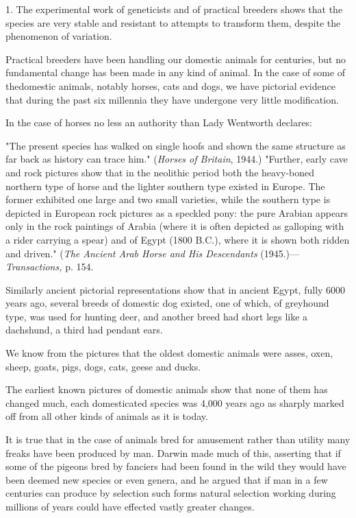 1. The experimental work of geneticists and of practical breeders shows that the species are
very stable and resistant to attempts to transform them, despite the phenomenon of variation.

Practical breeders have been handling our domestic animals for centuries, but no
fundamental change has been made in any kind of animal. In the case of some of thedomestic animals,
notably horses, cats and dogs, we have pictorial evidence that during the
past six millennia they have undergone very little modification.

In the case of horses no less an authority than Lady Wentworth declares:

"The present species has walked on single hoofs and shown the same structure as far back as
history can trace him." (\textit{Horses of Britain}, 1944.) "Further, early cave and rock pictures show
that in the neolithic period both the heavy-boned northern type of horse and the lighter
southern type existed in Europe. The former exhibited one large and two small varieties,
while the southern type is depicted in European rock pictures as a speckled pony: the pure
Arabian appears only in the rock paintings of Arabia (where it is often depicted as galloping
with a rider carrying a spear) and of Egypt (1800 B.C.), where it is shown both ridden and
driven." (\textit{The Ancient Arab Horse and His Descendants} (1945.)—\textit{Transactions,} p. 154.

Similarly ancient pictorial representations show that in ancient Egypt, fully 6000 years ago,
several breeds of domestic dog existed, one of which, of greyhound type, was used for
hunting deer, and another breed had short legs like a dachshund, a third had pendant ears.

We know from the pictures that the oldest domestic animals were asses, oxen, sheep, goats,
pigs, dogs, cats, geese and ducks.

The earliest known pictures of domestic animals show that none of them has changed much,
each domesticated species was 4,000 years ago as sharply marked off from all other kinds of
animals as it is today.

It is true that in the case of animals bred for amusement rather than utility many freaks have
been produced by man. Darwin made much of this, asserting that if some of the pigeons bred
by fanciers had been found in the wild they would have been deemed new species or even
genera, and he argued that if man in a few centuries can produce by selection such forms
natural selection working during millions of years could have effected vastly greater changes.

